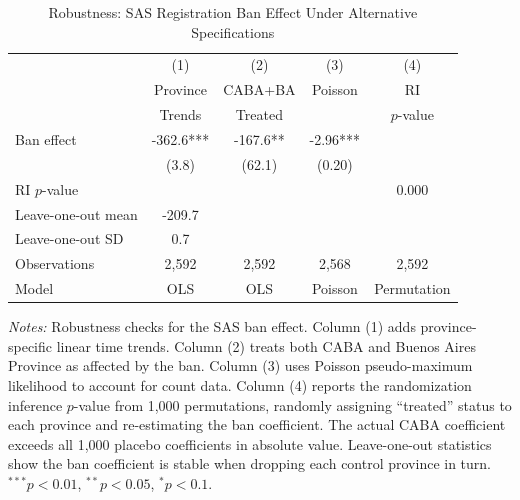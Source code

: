 \begin{table}[htbp]
\centering
\caption{Robustness: SAS Registration Ban Effect Under Alternative Specifications}
\label{tab:robust}
\begin{tabular}{l*{4}{c}}
\toprule
 & (1) & (2) & (3) & (4) \\
 & Province & CABA+BA & Poisson & RI \\
 & Trends & Treated & & $p$-value \\
\midrule
Ban effect & -362.6*** & -167.6** & -2.96*** & \\
 & (3.8) & (62.1) & (0.20) & \\
\addlinespace
RI $p$-value & & & & 0.000 \\
Leave-one-out mean & -209.7 & & & \\
Leave-one-out SD & 0.7 & & & \\
\midrule
Observations & 2,592 & 2,592 & 2,568 & 2,592 \\
Model & OLS & OLS & Poisson & Permutation \\
\bottomrule
\end{tabular}
\par\vspace{0.3em}\begin{minipage}{\textwidth}\footnotesize
\textit{Notes:} Robustness checks for the SAS ban effect. Column (1) adds province-specific linear time trends. Column (2) treats both CABA and Buenos Aires Province as affected by the ban. Column (3) uses Poisson pseudo-maximum likelihood to account for count data. Column (4) reports the randomization inference $p$-value from 1,000 permutations, randomly assigning ``treated'' status to each province and re-estimating the ban coefficient. The actual CABA coefficient exceeds all 1,000 placebo coefficients in absolute value. Leave-one-out statistics show the ban coefficient is stable when dropping each control province in turn. $^{***}p<0.01$, $^{**}p<0.05$, $^{*}p<0.1$.
\end{minipage}
\end{table}
